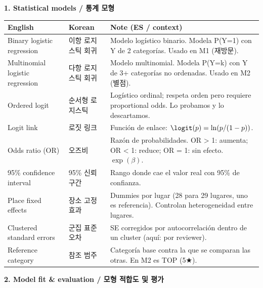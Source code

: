 \documentclass[10pt,a4paper]{article}
\begin{document}
\vspace{8pt}

\noindent\textbf{\large 1. Statistical models / 통계 모형}

\vspace{4pt}

\footnotesize

\begin{longtable}{@{}p{3.6cm} p{3.5cm} p{9cm}@{}}
\toprule
\textbf{English} & \textbf{Korean} & \textbf{Note (ES / context)} \\
\midrule
Binary logistic regression  & 이항 로지스틱 회귀         & Modelo logístico binario. Modela P(Y=1) con Y de 2 categorías. Usado en M1 (재방문). \\
Multinomial logistic regression & 다항 로지스틱 회귀      & Modelo multinomial. Modela P(Y=k) con Y de 3+ categorías no ordenadas. Usado en M2 (별점). \\
Ordered logit               & 순서형 로지스틱             & Logístico ordinal; respeta orden pero requiere proportional odds. Lo probamos y lo descartamos. \\
Logit link                  & 로짓 링크                    & Función de enlace: $\logit(p) = \ln(p/(1-p))$. \\
Odds ratio (OR)             & 오즈비                       & Razón de probabilidades. OR > 1: aumenta; OR < 1: reduce; OR = 1: sin efecto. $\exp(\beta)$. \\
95\% confidence interval    & 95\% 신뢰구간                & Rango donde cae el valor real con 95\% de confianza. \\
Place fixed effects         & 장소 고정효과                & Dummies por lugar (28 para 29 lugares, uno es referencia). Controlan heterogeneidad entre lugares. \\
Clustered standard errors   & 군집 표준오차                 & SE corregidos por autocorrelación dentro de un cluster (aquí: por reviewer). \\
Reference category          & 참조 범주                     & Categoría base contra la que se comparan las otras. En M2 es TOP (5★). \\
\bottomrule
\end{longtable}

\vspace{10pt}
\noindent\normalsize\textbf{\large 2. Model fit \& evaluation / 모형 적합도 및 평가}
\end{document}
